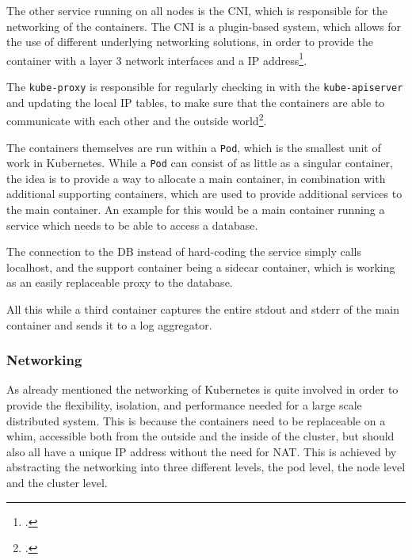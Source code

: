 The other service running on all nodes is the \ac{CNI}, which is responsible for the networking of the containers.
The \ac{CNI} is a plugin-based system, which allows for the use of different underlying networking solutions,
in order to provide the container with a layer 3 network interfaces and a \ac{IP} address\footcite{thelinuxfoundationCNI}.

The \texttt{kube-proxy} is responsible for regularly checking in with the \texttt{kube-apiserver} and updating the local \ac{IP} tables,
to make sure that the containers are able to communicate with each other and the outside world\footcite{kubernetes-docsKubeproxy}.

The containers themselves are run within a \texttt{Pod}, which is the smallest unit of work in Kubernetes.
While a \texttt{Pod} can consist of as little as a  singular container, the idea is to provide a way to allocate a main container,
in combination with additional supporting containers, which are used to provide additional services to the main container.
An example for this would be a main container running a service which needs to be able to access a database.

The connection to the \ac{DB} instead of hard-coding the service simply calls localhost,
and the support container being a sidecar container, which is working as an easily replaceable proxy to the database.

All this while a third container captures the entire stdout and stderr of the main container and sends it to a log aggregator.

\subsubsection{Networking}
\label{sec:K8sNetworking}

As already mentioned the networking of Kubernetes is quite involved in order to provide the flexibility, isolation, and performance needed for a large scale distributed system.
This is because the containers need to be replaceable on a whim, accessible both from the outside and the inside of the cluster,
but should also all have a unique \ac{IP} address without the need for \gls{NAT}.
This is achieved by abstracting the networking into three different levels, the pod level, the node level and the cluster level.


